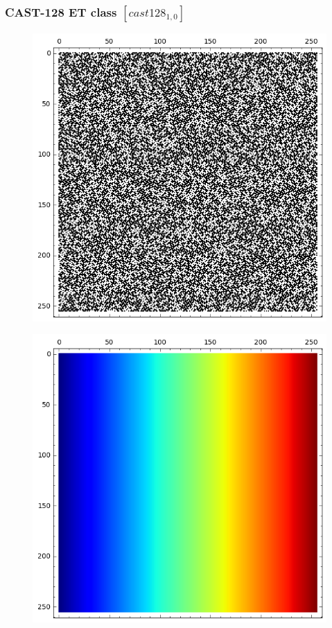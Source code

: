 \documentclass[pdf,sprung,slideColor,nocolorBG]{beamer}
\newenvironment{colortheme}[1]{
\def\ProvidesPackageRCS $##1${\relax}
\renewcommand{\ProcessOptions}{\relax}
\makeatletter

\makeatother
}{}
\begin{document}
\begin{colortheme}{jubata}

\begin{frame}
\frametitle{CAST-128 ET class $[cast128_{1,0}]$}
\begin{figure}
\centering
\begin{minipage}{.48\textwidth}
  \centering

\includegraphics[width=.9\linewidth]{../matrix_plot/cast128_1_0_weight_class_matrix.png}
  \label{fig:cast128_1_0_weight_class_matrix}
\end{minipage}
\begin{minipage}{.48\textwidth}
  \centering
\includegraphics[width=.9\linewidth]{../matrix_plot/cast128_1_0_bent_cayley_graph_index_matrix.png}

\end{minipage}
\end{figure}
\end{frame}
\end{colortheme}
\end{document}
